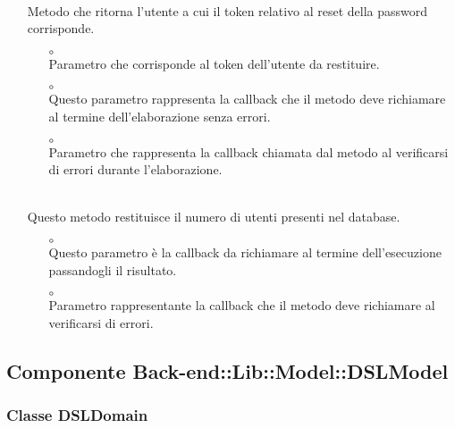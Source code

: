 \begin{itemize}
\begin{itemize}
\end{itemize}
\item[]  \\ Metodo che ritorna l'utente a cui il token relativo al reset della password corrisponde.
\begin{itemize}\addtolength{\itemsep}{-0.5\baselineskip}
\item[$\circ$]  \\ Parametro che corrisponde al token dell'utente da restituire.
\item[$\circ$]  \\ Questo parametro rappresenta la callback che il metodo deve richiamare al termine dell'elaborazione senza errori.
\item[$\circ$]  \\ Parametro che rappresenta la callback chiamata dal metodo al verificarsi di errori durante l'elaborazione.
\end{itemize}
\item[]  \\ Questo metodo restituisce il numero di utenti presenti nel database.
\begin{itemize}\addtolength{\itemsep}{-0.5\baselineskip}
\item[$\circ$]  \\ Questo parametro è la callback da richiamare al termine dell'esecuzione passandogli il risultato.
\item[$\circ$]  \\ Parametro rappresentante la callback che il metodo deve richiamare al verificarsi di errori.
\end{itemize}
\end{itemize}

\subsection{Componente Back-end::Lib::Model::DSLModel}

\subsubsection{Classe DSLDomain}

